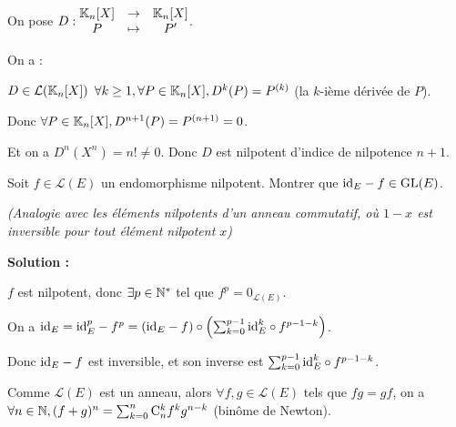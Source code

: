 \documentclass[12pt, a4paper]{report}
\begin{document}
\begin{example}
    On pose $D : \begin{matrix}
        \mathbb{K}_n[X] &\to &\mathbb{K}_n[X]\\
        P &\mapsto &P'
    \end{matrix}$.

    On a :
    \begin{outline}
        \1 $D \in \mathcal L(\mathbb{K}_n[X])$
        \1 $\forall k \ge 1, \forall P \in \mathbb{K}_n[X], D^k(P) = P^{(k)}$ (la $k$-ième dérivée de $P$).
    \end{outline}

    Donc $\forall P \in \mathbb{K}_n[X], D^{n+1}(P) = P^{(n+1)} = 0$.

    Et on a $D^n(X^n) = n! \neq 0$. Donc $D$ est nilpotent d'indice de nilpotence $n+1$.
\end{example}

\begin{exercise}
    Soit $f \in \mathcal L(E)$ un endomorphisme nilpotent. Montrer que $\mathrm{id}_E -f \in \mathrm{GL}(E)$.
    
    \textit{(Analogie avec les éléments nilpotents d'un anneau commutatif, où $1 - x$ est inversible pour tout élément nilpotent $x$)}

    \textbf{Solution :}

    \begin{outline}
        \1 $f$ est nilpotent, donc $\exists p \in \mathbb{N}^*$ tel que $f^p = 0_{\mathcal L(E)}$.

        \1 On a $\mathrm{id}_E = \mathrm{id}_E^p - f^p = (\mathrm{id}_E - f)\circ\left(\sum_{k=0}^{p-1} \mathrm{id}_E^k \circ f^{p-1-k}\right)$.

        \1 Donc $\mathrm{id}_E - f$ est inversible, et son inverse est $\sum_{k=0}^{p-1} \mathrm{id}_E^k \circ f^{p-1-k}$.
    \end{outline}
\end{exercise}

\begin{remark}
    Comme $\mathcal L(E)$ est un anneau, alors $\forall f,g \in \mathcal L(E)$ tels que $fg = gf$, on a $\forall n \in \mathbb{N}, (f+g)^n = \sum_{k=0}^n \mathrm{C}_{n}^{k} f^k g^{n-k}$ (binôme de Newton).
\end{remark}
\end{document}
